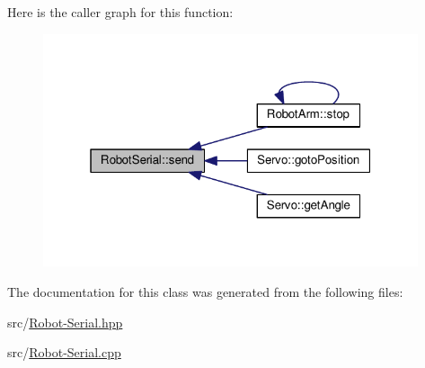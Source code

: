 Here is the caller graph for this function\+:\nopagebreak
\begin{figure}[H]
\begin{center}
\leavevmode
\includegraphics[width=313pt]{class_robot_serial_a48929a3b47818cf3366b003b121ed539_icgraph}
\end{center}
\end{figure}




The documentation for this class was generated from the following files\+:\begin{DoxyCompactItemize}
\item 
src/\hyperlink{_robot-_serial_8hpp}{Robot-\/\+Serial.\+hpp}\item 
src/\hyperlink{_robot-_serial_8cpp}{Robot-\/\+Serial.\+cpp}\end{DoxyCompactItemize}
